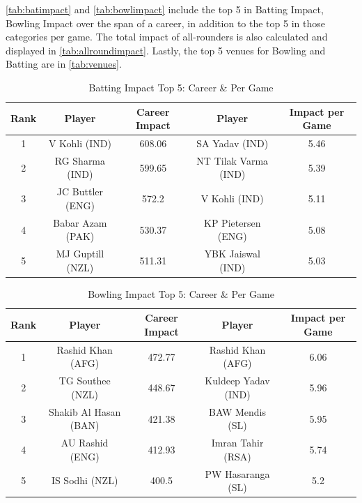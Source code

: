 \documentclass{article}[12pt]
\newcommand{\Autoref}[1]{\autoref{#1}}
\begin{document}
\Autoref{tab:batimpact} and \Autoref{tab:bowlimpact} include the top 5 in Batting Impact, Bowling Impact over the span of a career, in addition to the top 5 in those categories per game. The total impact of all-rounders is also calculated and displayed in \Autoref{tab:allroundimpact}. Lastly, the top 5 venues for Bowling and Batting are in \Autoref{tab:venues}. 



\newpage

\begin{table}[!h]
\centering
\begin{tabular}{ccccc} \hline
\textbf{Rank} & \textbf{Player} & \textbf{Career Impact} & \textbf{Player} & \textbf{Impact per Game} \\ \hline
1 & V Kohli (IND) & 608.06 & SA Yadav (IND) & 5.46 \\
2 & RG Sharma (IND) & 599.65 & NT Tilak Varma (IND) & 5.39 \\
3 & JC Buttler (ENG) & 572.2 & V Kohli (IND) & 5.11 \\
4 & Babar Azam (PAK) & 530.37 & KP Pietersen (ENG) & 5.08 \\
5 & MJ Guptill (NZL) & 511.31 & YBK Jaiswal (IND) & 5.03 \\ \hline
\end{tabular}
\caption{Batting Impact Top 5: Career \& Per Game}
\label{tab:batimpact}
\end{table}

\begin{table}[!h]
\centering
\begin{tabular}{ccccc} \hline
\textbf{Rank} & \textbf{Player} & \textbf{Career Impact} & \textbf{Player} & \textbf{Impact per Game} \\ \hline
1 & Rashid Khan (AFG) & 472.77 & Rashid Khan (AFG) & 6.06 \\
2 & TG Southee (NZL) & 448.67 & Kuldeep Yadav (IND) & 5.96 \\
3 & Shakib Al Hasan (BAN) & 421.38 & BAW Mendis (SL) & 5.95 \\
4 & AU Rashid (ENG) & 412.93 & Imran Tahir (RSA) & 5.74 \\
5 & IS Sodhi (NZL) & 400.5 & PW Hasaranga (SL) & 5.2 \\ \hline
\end{tabular}%
\caption{Bowling Impact Top 5: Career \& Per Game}
\label{tab:bowlimpact}
\end{table}
\end{document}
